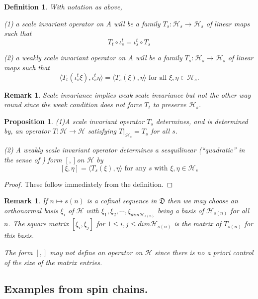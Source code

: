 \documentclass[11pt]{amsart}
\newtheorem{proposition}[theorem]{Proposition}
\newtheorem{definition}[theorem]{Definition}
\newtheorem{remark}[theorem]{Remark}
\newcommand{\1}{\mathcal I}
\newcommand{\5}{\vskip 5pt}
\begin{document}
 \begin{definition}\label{scaleinvariancedef} 
 With notation as above,
 
 (1) a \emph{scale invariant operator} on $A$ will be a family 
 $T_s:\mathcal H_s\rightarrow \mathcal H_s$ of linear maps such that $$ T_t \circ \iota_s^t=\iota_s^t \circ T_s$$
 
 (2)   a \emph{weakly scale invariant operator} on $A$ will be a family 
 $T_s:\mathcal H_s\rightarrow \mathcal H_s$ of linear maps such that
  $$\langle T_t ( \iota_s^t \xi), \iota_s^t \eta \rangle=\langle  T_s(\xi),\eta \rangle\mbox{   for all   } \xi,\eta \in \mathcal H_s.$$
 \end{definition}
 \begin{remark} Scale invariance implies weak scale invariance but not the other way round  since the weak condition does not force
 $T_t$ to preserve $\mathcal H_s$. 
 \end{remark}
 \begin{proposition} \label{determines}(1)A scale invariant operator $T_s$ determines, and is determined by, an operator $T:\mathcal H\rightarrow \mathcal H$ satisfying $T|_{\mathcal H_s}=T_s$ for all $s$. 
 
 (2) A weakly scale invariant operator determines a sesquilinear (``quadratic'' in the sense of \cite{simon}) form $[,]$on $\mathcal H$ by
 $$ [\xi,\eta]=\langle T_s (\xi), \eta\rangle \mbox{  for any $s$ with  } \xi,\eta \in \mathcal H_s$$
 
 \end{proposition} 
 \begin{proof} These follow immediately from the definition.
 \end{proof}
 \begin{remark} If $n\mapsto s(n)$ is a cofinal sequence in $\mathfrak D$ then we may choose an orthonormal basis
 $\xi_i$ of $\mathcal H$ with $\xi_1,\xi_2,\cdots, \xi_{dim \mathcal H_{s(n)}}$ being a basis of $\mathcal H_{s(n)}$ for
 all $n$. The square matrix $[\xi_i,\xi_j]$ for $1\leq i,j \leq dim \mathcal H_{s(n)}$ is the matrix of $T_{s(n)}$ for this
 basis. 
 
 The form $[,]$ may not define an operator on $\mathcal H$  since there is no a priori control of the size of the
 matrix entries.
 \end{remark}
 
 \subsection{Examples from spin chains.}
 
\end{document}
